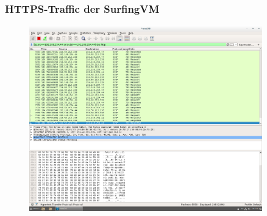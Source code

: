 \documentclass[12pt]{article}
\theoremstyle{plain}
\begin{document}
\subsubsection*{HTTPS-Traffic der SurfingVM}
\begin{figure}[!ht]
	\centering
     \includegraphics[width=0.9\textwidth]{Bilder/https_traffic_surfingvm.png}
\end{figure}
\end{document}
